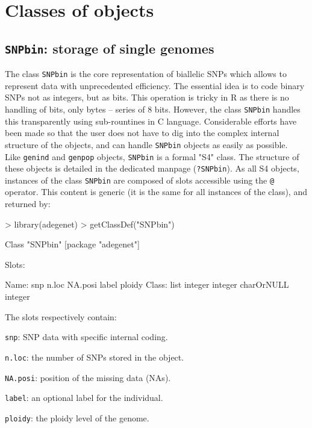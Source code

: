 \documentclass{article}
\newcommand{\code}[1]{{{\tt #1}}}
\begin{document}
\section{Classes of objects}

\subsection{\code{SNPbin}: storage of single genomes}
The class \texttt{SNPbin} is the core representation of biallelic SNPs which allows to represent
data with unprecedented efficiency.
The essential idea is to code binary SNPs not as integers, but as bits. This operation is tricky in
R as there is no handling of bits, only bytes -- series of 8 bits. However, the class
\texttt{SNPbin} handles this transparently using sub-rountines in C language.
Considerable efforts have been made so that the user does not have to dig into the complex internal
structure of the objects, and can handle \texttt{SNPbin} objects as easily as possible.
\\

Like \texttt{genind} and \texttt{genpop} objects, \texttt{SNPbin} is a formal "S4" class. The
structure of these objects is detailed in the dedicated manpage (\texttt{?SNPbin}). As all S4
objects, instances of the class \texttt{SNPbin} are composed of slots accessible using the
\texttt{@} operator. This content is generic (it is the same for all instances of the class), and returned by:
\begin{Schunk}
\begin{Sinput}
> library(adegenet)
> getClassDef("SNPbin")
\end{Sinput}
\begin{Soutput}
Class "SNPbin" [package "adegenet"]

Slots:
                                                             
Name:         snp      n.loc    NA.posi      label     ploidy
Class:       list    integer    integer charOrNULL    integer
\end{Soutput}
\end{Schunk}

The slots respectively contain:
\begin{description}
  \item \texttt{snp}: SNP data with specific internal coding.
  \item \texttt{n.loc}: the number of SNPs stored in the object.
  \item \texttt{NA.posi}: position of the missing data (NAs).
  \item \texttt{label}: an optional label for the individual.
  \item \texttt{ploidy}: the ploidy level of the genome.
\end{description}
\end{document}
